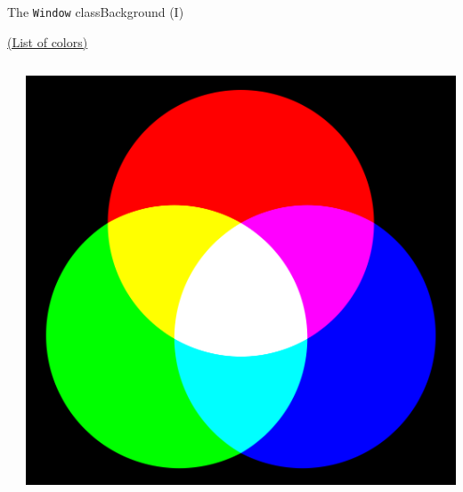 \documentclass[10pt,compress]{beamer} %
\begin{document}
\begin{frame}{The \texttt{Window} class}{Background (I)}
    \begin{exampleblock}{}
	\vspace{-0.2cm}
	
	\vspace{-0.2cm}
    \end{exampleblock}

    \centering \href{https://api.arcade.academy/en/latest/arcade.color.html}{(List of colors)}

    \bigskip

    \begin{columns}
		\begin{exampleblock}{}
		\vspace{-0.2cm}
		
		\vspace{-0.2cm}
		\end{exampleblock}

		\includegraphics[width=\linewidth]{figs/rgb}\\
    \end{columns}
\end{frame}
\end{document}
